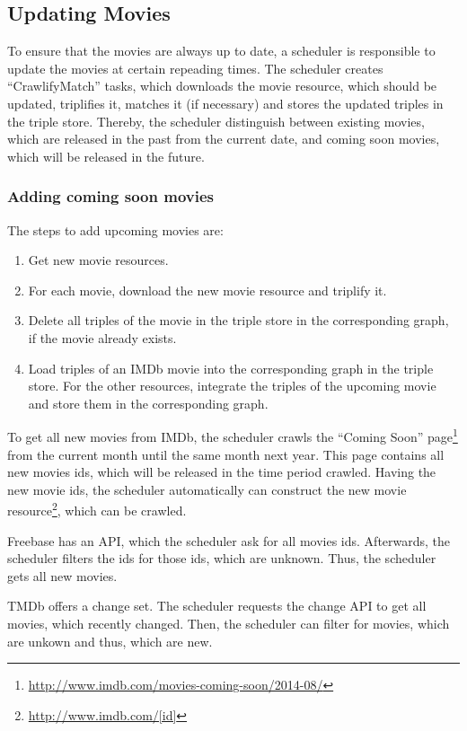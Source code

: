 \subsection{Updating Movies}
\label{subsec_method_updating}

To ensure that the movies are always up to date, a scheduler is responsible to update the movies at certain repeading times.
The scheduler creates ``CrawlifyMatch'' tasks, which downloads the movie resource, which should be updated, triplifies it, matches it (if necessary) and stores the updated triples in the triple store.
Thereby, the scheduler distinguish between existing movies, which are released in the past from the current date, and coming soon movies, which will be released in the future.

\subsubsection{Adding coming soon movies}
The steps to add upcoming movies are:
\begin {enumerate}
	\item Get new movie resources.
	\item For each movie, download the new movie resource and triplify it.
	\item Delete all triples of the movie in the triple store in the corresponding graph, if the movie already exists.
	\item Load triples of an IMDb movie into the corresponding graph in the triple store. For the other resources, integrate the triples of the upcoming movie and store them in the corresponding graph.
\end{enumerate}

To get all new movies from IMDb, the scheduler crawls the ``Coming Soon'' page\footnote{\url{http://www.imdb.com/movies-coming-soon/2014-08/}} from the current month until the same month next year.
This page contains all new movies ids, which will be released in the time period crawled.
Having the new movie ids, the scheduler automatically can construct the new movie resource\footnote{\url{http://www.imdb.com/[id]}}, which can be crawled.

Freebase has an API, which the scheduler ask for all movies ids.
Afterwards, the scheduler filters the ids for those ids, which are unknown.
Thus, the scheduler gets all new movies.

TMDb offers a change set.
The scheduler requests the change API to get all movies, which recently changed.
Then, the scheduler can filter for movies, which are unkown and thus, which are new.

